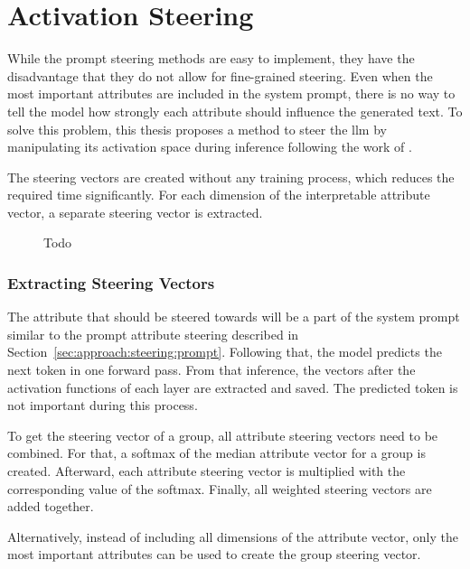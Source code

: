 \section{Activation Steering}

While the prompt steering methods are easy to implement, they have the disadvantage that they do not allow for fine-grained steering. Even when the most important attributes are included in the system prompt, there is no way to tell the model how strongly each attribute should influence the generated text. To solve this problem, this thesis proposes a method to steer the \ac{llm} by manipulating its activation space during inference following the work of \citet{turnerActivationAdditionSteering2024,rimsky-etal-2024-steering}.

The steering vectors are created without any training process, which reduces the required time significantly. For each dimension of the interpretable attribute vector, a separate steering vector is extracted.

\begin{figure}[ht]
  
  \label{fig:activationSteering}
  \caption{Todo}
\end{figure}

\subsubsection{Extracting Steering Vectors}
The attribute that should be steered towards will be a part of the system prompt similar to the prompt attribute steering described in Section~\ref{sec:approach:steering:prompt}. Following that, the model predicts the next token in one forward pass. From that inference, the vectors after the activation functions of each layer are extracted and saved. The predicted token is not important during this process. %

To get the steering vector of a group, all attribute steering vectors need to be combined. For that, a softmax of the median attribute vector for a group is created. Afterward, each attribute steering vector is multiplied with the corresponding value of the softmax. Finally, all weighted steering vectors are added together.

Alternatively, instead of including all dimensions of the attribute vector, only the most important attributes can be used to create the group steering vector.

